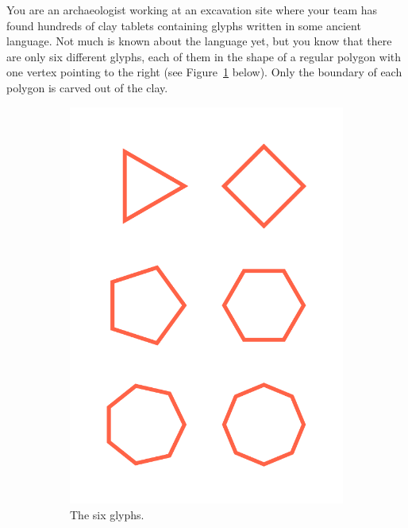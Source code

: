 
You are an archaeologist working at an excavation site where your team
has found hundreds of clay tablets containing glyphs written in some
ancient language. Not much is known about the language yet, but you
know that there are only six different glyphs, each of them in the
shape of a regular polygon with one vertex pointing to the right (see
Figure~\ref{fig:alphabet} below). Only the boundary of each polygon is
carved out of the clay.

\begin{figure}[!h]
  \begin{subfigure}[t]{.23\textwidth}
    \centering
    \includegraphics[width=\textwidth]{alphabet.pdf}
    \caption{The six glyphs.}
    \label{fig:alphabet}
  \end{subfigure}%
  \begin{subfigure}[t]{.37\textwidth}

\end{subfigure}
\end{figure}
